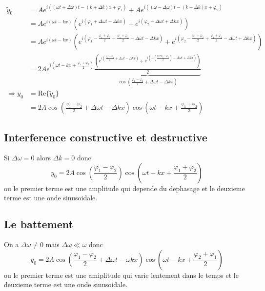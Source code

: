 \begin{align*}
\tilde{y}_{0} & =Ae^{i((\omega t+\Delta \omega)t-(k+\Delta k)x+\varphi_{1})}+Ae^{i((\omega-\Delta \omega)t-(k-\Delta k)x+\varphi_{2})} \\
 & =Ae^{i(\omega t-kx)}(e^{i(\varphi_{1}+\Delta \omega t-\Delta kx)}+e^{i(\varphi_{2}-\Delta \omega t+\Delta kx)}) \\
 & =Ae^{i(\omega t-kx)}\left( e^{i\left( \varphi_{1}-\frac{\varphi_{1}+\varphi_{2}}{2}+\frac{\varphi_{1}+\varphi_{2}}{2}+\Delta \omega t-\Delta kx \right)}+e^{i\left( \varphi_{2}-\frac{\varphi_{1}+\varphi_{2}}{2}+\frac{\varphi_{1}+\varphi_{2}}{2}-\Delta \omega t+\Delta kx  \right)} \right) \\
 & =2Ae^{i\left( \omega t-kx+\frac{\varphi_{1}+\varphi_{2}}{2} \right)}\underbrace{ \frac{\left( e^{i\left( \frac{\varphi_{1}-\varphi_{2} } {2} +\Delta \omega t-\Delta kx \right)}+e^{i\left( -\left( \frac{avr\phi_{1}-\varphi_{2}}{2} \right)-\Delta \omega t+\Delta kx \right)} \right)}{2} }_{ \cos \left( \frac{\varphi_{1}-\varphi_{2}}{2}+\Delta \omega t-\Delta kx  \right) }  \\
\Rightarrow y_{0} & =\mathrm{Re}\{ \tilde{y} _{0}\} \\
 & =2A\cos\left( \frac{\varphi_{1}-\varphi_{2}}{2}+\Delta \omega t-\Delta kx \right)\cos\left( \omega t-kx+\frac{\varphi_{1}+\varphi_{2}}{2} \right)
\end{align*}

\subsection{Interference constructive et destructive}

Si $\Delta \omega=0$ alors $\Delta k=0$ donc
$$
y_{0}=2A\cos\left( \frac{\varphi_{1}-\varphi_{2}}{2} \right)\cos\left( \omega t-kx+\frac{\varphi_{1}+\varphi_{2}}{2} \right)
$$
ou le premier terme est une amplitude qui depende du dephasage et le deuxieme terme est une onde sinusoidale.

\subsection{Le battement}

On a $\Delta \omega\neq 0$ mais $\Delta \omega\ll \omega$ donc
$$
y_{0}=2A\cos\left( \frac{\varphi_{1}-\varphi_{2}}{2}+\Delta \omega t-\omega kx \right)\cos\left( \omega t-kx+\frac{\varphi_{2}+\varphi_{1}}{2} \right)
$$
ou le premier terme est une amiplitude qui varie lentement dans le temps et le deuxieme terme est une onde sinusoidale.

